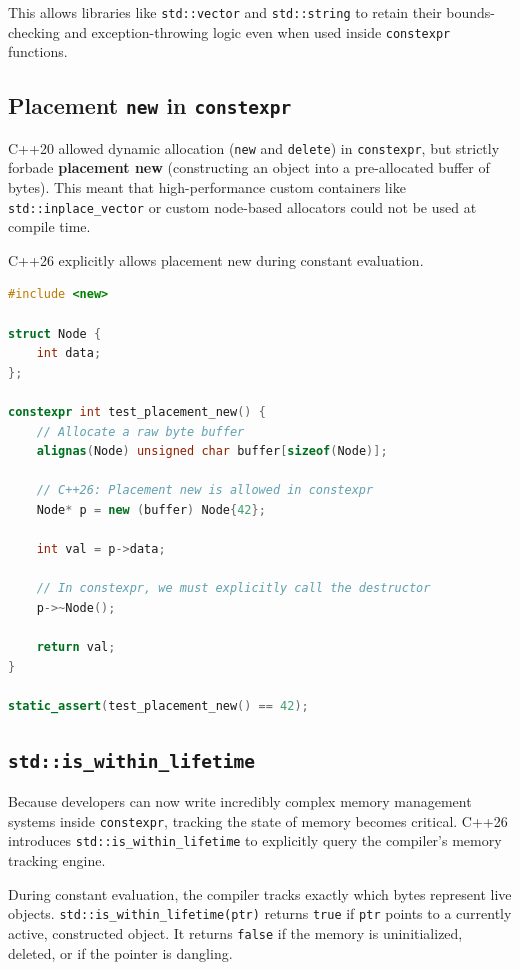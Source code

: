 This allows libraries like \texttt{std::vector} and \texttt{std::string} to retain their bounds-checking and exception-throwing logic even when used inside \texttt{constexpr} functions.

\subsection{Placement \texttt{new} in \texttt{constexpr}}

C++20 allowed dynamic allocation (\texttt{new} and \texttt{delete}) in \texttt{constexpr}, but strictly forbade \textbf{placement new} (constructing an object into a pre-allocated buffer of bytes). This meant that high-performance custom containers like \texttt{std::inplace_vector} or custom node-based allocators could not be used at compile time.

C++26 explicitly allows placement new during constant evaluation.

\begin{lstlisting}[language=C++]
#include <new>

struct Node {
    int data;
};

constexpr int test_placement_new() {
    // Allocate a raw byte buffer
    alignas(Node) unsigned char buffer[sizeof(Node)];
    
    // C++26: Placement new is allowed in constexpr
    Node* p = new (buffer) Node{42};
    
    int val = p->data;
    
    // In constexpr, we must explicitly call the destructor
    p->~Node();
    
    return val;
}

static_assert(test_placement_new() == 42);
\end{lstlisting}

\subsection{\texttt{std::is_within_lifetime}}

Because developers can now write incredibly complex memory management systems inside \texttt{constexpr}, tracking the state of memory becomes critical. C++26 introduces \texttt{std::is_within_lifetime} to explicitly query the compiler's memory tracking engine.

During constant evaluation, the compiler tracks exactly which bytes represent live objects. \texttt{std::is_within_lifetime(ptr)} returns \texttt{true} if \texttt{ptr} points to a currently active, constructed object. It returns \texttt{false} if the memory is uninitialized, deleted, or if the pointer is dangling.

